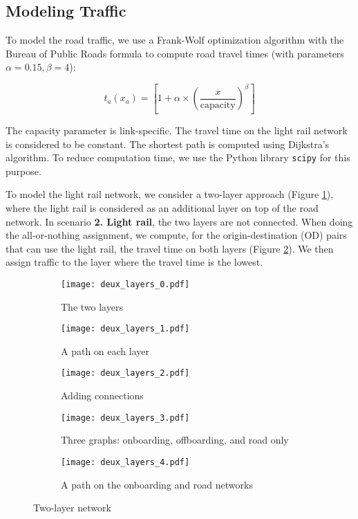 \subsection{Modeling Traffic}

To model the road traffic, we use a Frank-Wolf optimization algorithm with the Bureau of Public Roads formula to compute road travel times (with parameters $\alpha = 0.15, \beta = 4$): 

\begin{equation}
    t_a(x_a) = \left [ 1 + \alpha \times \left (\frac{x}{\text{capacity}} \right )^\beta \right ]
\end{equation}

The capacity parameter is link-specific. The travel time on the light rail network is considered to be constant. The shortest path is computed using Dijkstra's algorithm. To reduce computation time, we use the Python library \texttt{scipy} for this purpose.

To model the light rail network, we consider a two-layer approach (Figure \ref{fig:2layer_0}), where the light rail is considered as an additional layer on top of the road network. In scenario \textbf{2. Light rail}, the two layers are not connected. When doing the all-or-nothing assignment, we compute, for the origin-destination (OD) pairs that can use the light rail, the travel time on both layers (Figure \ref{fig:2layer_1}). We then assign traffic to the layer where the travel time is the lowest.

\begin{figure}
    \centering
    \begin{subfigure}{0.33\textwidth}
        \centering
        \texttt{[image: deux\_layers\_0.pdf]}
        \caption{The two layers}
        \label{fig:2layer_0}
    \end{subfigure}%
    \begin{subfigure}{0.33\textwidth}
        \centering
        \texttt{[image: deux\_layers\_1.pdf]}
        \caption{A path on each layer}
        \label{fig:2layer_1}
    \end{subfigure}
    \begin{subfigure}{0.33\textwidth}
        \centering
        \texttt{[image: deux\_layers\_2.pdf]}
        \caption{Adding connections\\}
        \label{fig:2layer_2}
    \end{subfigure}%
    \begin{subfigure}{0.33\textwidth}
        \centering
        \texttt{[image: deux\_layers\_3.pdf]}
        \caption{Three graphs: onboarding, offboarding, and road only
        \label{fig:2layer_3}}
    \end{subfigure}%
    \begin{subfigure}{0.33\textwidth}
        \centering
        \texttt{[image: deux\_layers\_4.pdf]}
        \caption{A path on the onboarding and road networks}
        \label{fig:2layer_4}
    \end{subfigure}%
    \caption{Two-layer network}
\end{figure}

